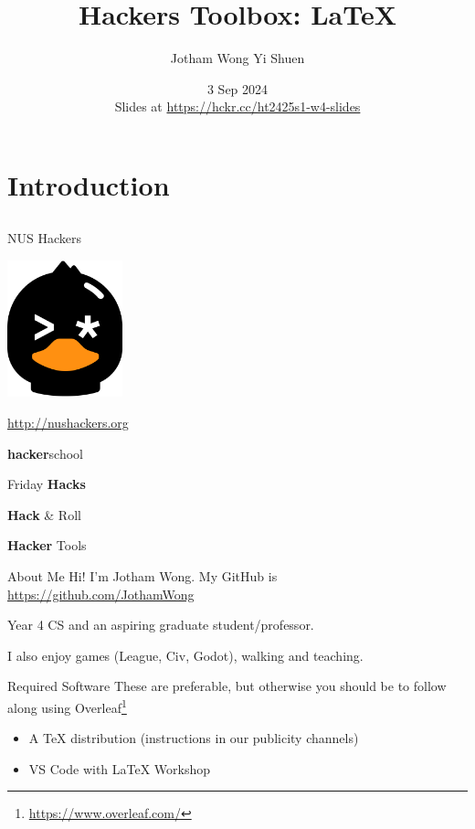 \documentclass[12pt]{beamer}
\title{Hackers Toolbox: \LaTeX{}}
\author{Jotham Wong Yi Shuen}
\date{3 Sep 2024 \\ Slides at \url{https://hckr.cc/ht2425s1-w4-slides}}
\begin{document}
\frame[plain]{\titlepage}

\section{Introduction}
\subsection{}

\begin{frame}{NUS Hackers}

  \begin{center}
    \includegraphics[width=0.25\textwidth]{./res/logo_head_light.png}
    
    \url{http://nushackers.org}
  \end{center}

  \begin{center}
    \textbf{hacker}school

    Friday \textbf{Hacks}

    \textbf{Hack} \& Roll

    \textbf{Hacker} Tools
  \end{center}

\end{frame}

\begin{frame}{About Me}
  Hi! I'm Jotham Wong. My GitHub is \url{https://github.com/JothamWong}

  Year 4 CS and an aspiring graduate student/professor.

  I also enjoy games (League, Civ, Godot), walking and teaching.

\end{frame}

\begin{frame}{Required Software}
  These are preferable, but otherwise you should be to follow along using Overleaf\footnote{\url{https://www.overleaf.com/}}
  \begin{itemize}
    \item A \TeX{} distribution (instructions in our publicity channels)
    \item VS Code with LaTeX Workshop
  \end{itemize}
\end{frame}
\end{document}

